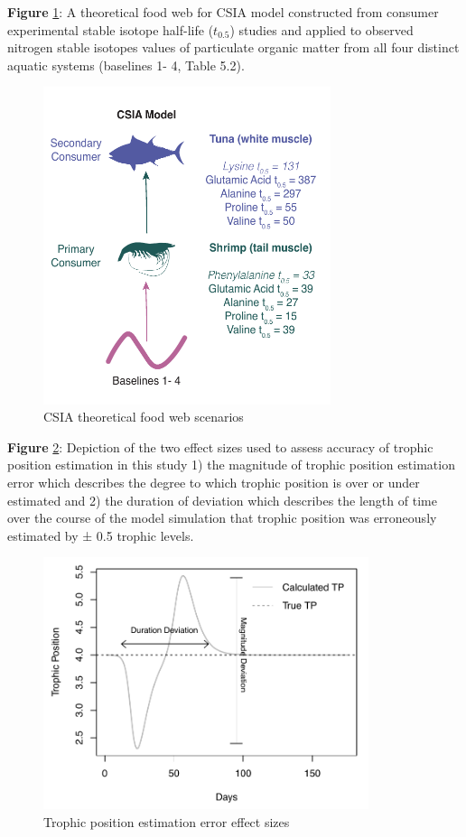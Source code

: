\documentclass [11pt, proquest] {uwthesis}[2015/03/03]
\begin{document}
\textbf{Figure} \ref{fig:CSIA}: A theoretical food web for CSIA model
constructed from consumer experimental stable isotope half-life
(\(t_{0.5}\)) studies and applied to observed nitrogen stable isotopes
values of particulate organic matter from all four distinct aquatic
systems (baselines 1- 4, Table 5.2). \newline 
\begin{figure}[h]
\centering
  \includegraphics[width=0.75\textwidth]{figure/Ch5/Figure2.pdf}
  \caption{CSIA theoretical food web scenarios}
  \label{fig:CSIA}
\end{figure}
\clearpage

\textbf{Figure} \ref{fig:EffectSize}: Depiction of the two effect sizes
used to assess accuracy of trophic position estimation in this study 1)
the magnitude of trophic position estimation error which describes the
degree to which trophic position is over or under estimated and 2) the
duration of deviation which describes the length of time over the course
of the model simulation that trophic position was erroneously estimated
by ± 0.5 trophic levels. \newline 
\begin{figure}[h]
\centering
  \includegraphics[width=0.85\textwidth]{figure/Ch5/Figure3.pdf}
  \caption{Trophic position estimation error effect sizes}
  \label{fig:EffectSize}
\end{figure}
\clearpage
\end{document}
